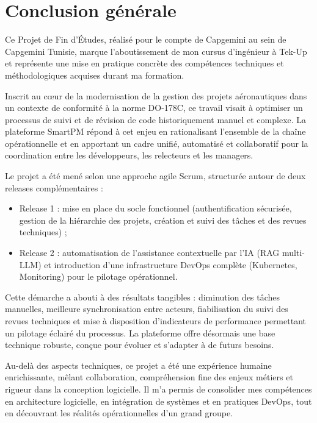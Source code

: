 \chapter*{Conclusion g\'en\'erale}
\vspace{0.3cm}

Ce Projet de Fin d'\'Etudes, r\'ealis\'e pour le compte de Capgemini au sein de Capgemini Tunisie, marque l'aboutissement de mon cursus d'ing\'enieur \`a Tek-Up et repr\'esente une mise en pratique concr\`ete des comp\'etences techniques et m\'ethodologiques acquises durant ma formation.

Inscrit au c\oe ur de la modernisation de la gestion des projets a\'eronautiques dans un contexte de conformit\'e \`a la norme DO-178C, ce travail visait \`a optimiser un processus de suivi et de r\'evision de code historiquement manuel et complexe. La plateforme SmartPM r\'epond \`a cet enjeu en rationalisant l'ensemble de la cha\^ine op\'erationnelle et en apportant un cadre unifi\'e, automatis\'e et collaboratif pour la coordination entre les d\'eveloppeurs, les relecteurs et les managers.

Le projet a \'et\'e men\'e selon une approche agile Scrum, structur\'ee autour de deux releases compl\'ementaires :
\begin{itemize}
  \item Release 1 : mise en place du socle fonctionnel (authentification s\'ecuris\'ee, gestion de la hi\'erarchie des projets, cr\'eation et suivi des t\^aches et des revues techniques) ;
  \item Release 2 : automatisation de l'assistance contextuelle par l'IA (RAG multi-LLM) et introduction d'une infrastructure DevOps compl\`ete (Kubernetes, Monitoring) pour le pilotage op\'erationnel.
\end{itemize}

Cette d\'emarche a abouti \`a des r\'esultats tangibles : diminution des t\^aches manuelles, meilleure synchronisation entre acteurs, fiabilisation du suivi des revues techniques et mise \`a disposition d'indicateurs de performance permettant un pilotage \'eclair\'e du processus. La plateforme offre d\'esormais une base technique robuste, con\c{c}ue pour \'evoluer et s'adapter \`a de futurs besoins.

Au-del\`a des aspects techniques, ce projet a \'et\'e une exp\'erience humaine enrichissante, m\^elant collaboration, compr\'ehension fine des enjeux m\'etiers et rigueur dans la conception logicielle. Il m'a permis de consolider mes comp\'etences en architecture logicielle, en int\'egration de syst\`emes et en pratiques DevOps, tout en d\'ecouvrant les r\'ealit\'es op\'erationnelles d'un grand groupe.

